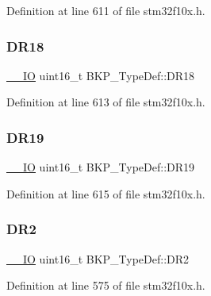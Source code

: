 Definition at line 611 of file stm32f10x.\+h.

\mbox{\label{struct_b_k_p___type_def_a9a1b09d229ccb45e67108fdfee779d1d}} 
\subsubsection{\texorpdfstring{D\+R18}{DR18}}
{\footnotesize\ttfamily \hyperlink{core__sc300_8h_aec43007d9998a0a0e01faede4133d6be}{\+\_\+\+\_\+\+IO} uint16\+\_\+t B\+K\+P\+\_\+\+Type\+Def\+::\+D\+R18}



Definition at line 613 of file stm32f10x.\+h.

\mbox{\label{struct_b_k_p___type_def_a7bddb28e7571f4c91ad1990123a61d7e}} 
\subsubsection{\texorpdfstring{D\+R19}{DR19}}
{\footnotesize\ttfamily \hyperlink{core__sc300_8h_aec43007d9998a0a0e01faede4133d6be}{\+\_\+\+\_\+\+IO} uint16\+\_\+t B\+K\+P\+\_\+\+Type\+Def\+::\+D\+R19}



Definition at line 615 of file stm32f10x.\+h.

\mbox{\label{struct_b_k_p___type_def_a98d088136a3ba92025a8381d9a19f7b0}} 
\subsubsection{\texorpdfstring{D\+R2}{DR2}}
{\footnotesize\ttfamily \hyperlink{core__sc300_8h_aec43007d9998a0a0e01faede4133d6be}{\+\_\+\+\_\+\+IO} uint16\+\_\+t B\+K\+P\+\_\+\+Type\+Def\+::\+D\+R2}



Definition at line 575 of file stm32f10x.\+h.

\mbox{\label{struct_b_k_p___type_def_a107bde73006459510e9ba42579f6c327}} 
